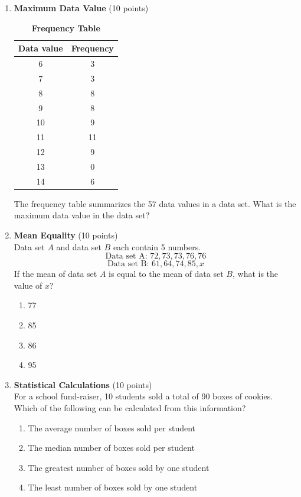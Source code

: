 \begin{enumerate}
  \item \textbf{Maximum Data Value} (10 points)\\
  \begin{table}[h!]
  \centering
  \renewcommand{\arraystretch}{1.3}
  \setlength{\tabcolsep}{8pt}
  \caption*{\textbf{Frequency Table}}
  \begin{tabular}{|c|c|}
  \hline
  \rowcolor[HTML]{E0E0E0}
  \textbf{Data value} & \textbf{Frequency} \\
  \hline
  6 & 3 \\
  \hline
  7 & 3 \\
  \hline
  8 & 8 \\
  \hline
  9 & 8 \\
  \hline
  10 & 9 \\
  \hline
  11 & 11 \\
  \hline
  12 & 9 \\
  \hline
  13 & 0 \\
  \hline
  14 & 6 \\
  \hline
  \end{tabular}
  \end{table}
  The frequency table summarizes the 57 data values in a data set. What is the maximum data value in the data set?
  \begin{subanswer}
  \end{subanswer}

  \item \textbf{Mean Equality} (10 points)\\
  Data set $A$ and data set $B$ each contain 5 numbers.
  \[
  \text{Data set A: }72,73,73,76,76
  \]
  \[
  \text{Data set B: }61, 64, 74, 85, x
  \]
  If the mean of data set $A$ is equal to the mean of data set $B$, what is the value of $x$?
  \begin{enumerate}[label=(\Alph*)]
    \item 77
    \item 85
    \item 86
    \item 95
  \end{enumerate}
  \begin{subanswer}
  \end{subanswer}

  \item \textbf{Statistical Calculations} (10 points)\\
  For a school fund-raiser, 10 students sold a total of 90 boxes of cookies. Which of the following can be calculated from this information?
  \begin{enumerate}[label=(\Alph*)]
    \item The average number of boxes sold per student
    \item The median number of boxes sold per student
    \item The greatest number of boxes sold by one student
    \item The least number of boxes sold by one student
  \end{enumerate}
  \begin{subanswer}
  \end{subanswer}


\end{enumerate}
